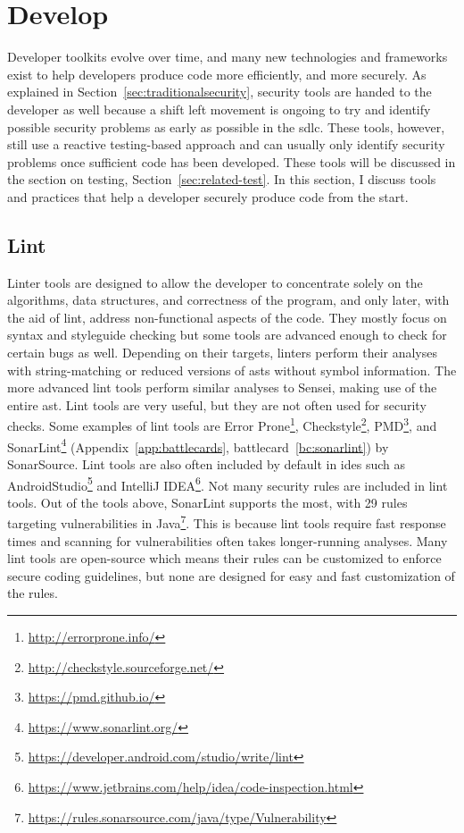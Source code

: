 \section{Develop}

Developer toolkits evolve over time, and many new technologies and frameworks exist to help developers produce code more efficiently, and more securely.
As explained in Section~\ref{sec:traditionalsecurity}, security tools are handed to the developer as well because a shift left movement is ongoing to try and identify possible security problems as early as possible in the \gls{sdlc}.
These tools, however, still use a reactive testing-based approach and can usually only identify security problems once sufficient code has been developed.
These tools will be discussed in the section on testing, Section~\ref{sec:related-test}.
In this section, I discuss tools and practices that help a developer securely produce code from the start.

\subsection{Lint}
Linter tools are designed to allow the developer to concentrate solely on the algorithms, data structures, and correctness of the program, and only later, with the aid of lint, address non-functional aspects of the code.
They mostly focus on syntax and styleguide checking but some tools are advanced enough to check for certain bugs as well.
Depending on their targets, linters perform their analyses with string-matching or reduced versions of \glspl{ast} without symbol information.
The more advanced lint tools perform similar analyses to Sensei, making use of the entire \gls{ast}.
Lint tools are very useful, but they are not often used for security checks.
Some examples of lint tools are Error Prone\footnote{\url{http://errorprone.info/}}, Checkstyle\footnote{\url{http://checkstyle.sourceforge.net/}}, PMD\footnote{\url{https://pmd.github.io/}}, and SonarLint\footnote{\url{https://www.sonarlint.org/}} (Appendix~\ref{app:battlecards}, battlecard~\ref{bc:sonarlint}) by SonarSource.
Lint tools are also often included by default in \glspl{ide} such as AndroidStudio\footnote{\url{https://developer.android.com/studio/write/lint}} and IntelliJ IDEA\footnote{\url{https://www.jetbrains.com/help/idea/code-inspection.html}}.
Not many security rules are included in lint tools.
Out of the tools above, SonarLint supports the most, with 29 rules targeting vulnerabilities in Java\footnote{\url{https://rules.sonarsource.com/java/type/Vulnerability}}.
This is because lint tools require fast response times and scanning for vulnerabilities often takes longer-running analyses.
Many lint tools are open-source which means their rules can be customized to enforce secure coding guidelines, but none are designed for easy and fast customization of the rules.

